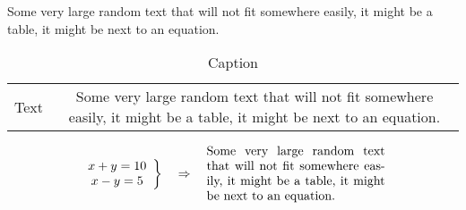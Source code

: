 \documentclass[12pt]{article}
\begin{document}
Some very large random text that will not fit somewhere easily, it might be a table, it might be next to an equation.

\begin{table}[h]
	\centering
	\begin{tabular}{|c|c|}
	\hline 
		Text & \parbox{.25\textwidth}{\centering Some very large random text that will not fit somewhere easily, it might be a table, it might be next to an equation.} \\\hline
	\end{tabular}
	\caption{Caption}
	\label{tab:my_label}
\end{table}

\begin{align*}
	\left.\begin{array}{c}
		x + y = 10\\
		x - y = 5
	\end{array}\right\} \quad \Rightarrow \quad \text{\parbox{5cm}{Some very large random text that will not fit somewhere easily, it might be a table, it might be next to an equation.}}
\end{align*}
\end{document}
